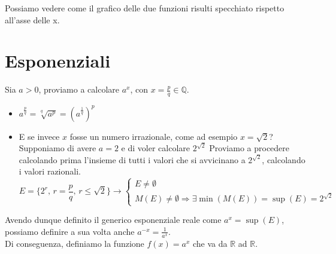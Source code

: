 \documentclass[12pt]{report}
\newcommand{\Q}{\mathbb{Q}}
\newcommand{\R}{\mathbb{R}}
\begin{document}
	\begin{center}
		
		
	\end{center}
	
	Possiamo vedere come il grafico delle due funzioni risulti specchiato rispetto all'asse delle x.
	
	\newpage
	\section{Esponenziali}
	
	Sia $a > 0$, proviamo a calcolare $a^x$, con $x = \frac{p}{q}\in \Q$.
	\begin{itemize}
		
		\item $a^{\frac{p}{q}} = \sqrt[q]{a^p} = (a^{\frac{1}{q}})^p$
		
		\item E se invece $x$ fosse un numero irrazionale, come ad esempio $x = \sqrt{2}$? Supponiamo di avere $a = 2$ e di voler calcolare $2^{\sqrt{2}}$
		Proviamo a procedere calcolando prima l'insieme di tutti i valori che si avvicinano a $2^{\sqrt{2}}$, calcolando i valori razionali. 
		\[
			E = \{2^r,\,r = \frac{p}{q},\, r \leq \sqrt{2}\} \to
			\begin{cases}
				E \neq \emptyset\\
				M(E) \neq \emptyset \Rightarrow \exists \min(M(E)) = \sup(E) = 2^{\sqrt{2}}
			\end{cases}
		\]
		
	\end{itemize}
	
	Avendo dunque definito il generico esponenziale reale come $a^x = \sup(E)$, possiamo definire a sua volta anche $a^{-x} = \frac{1}{a^x}$.\\
	Di conseguenza, definiamo la funzione $f(x) = a^x$ che va da $\R$ ad $\R$.
	
\end{document}
